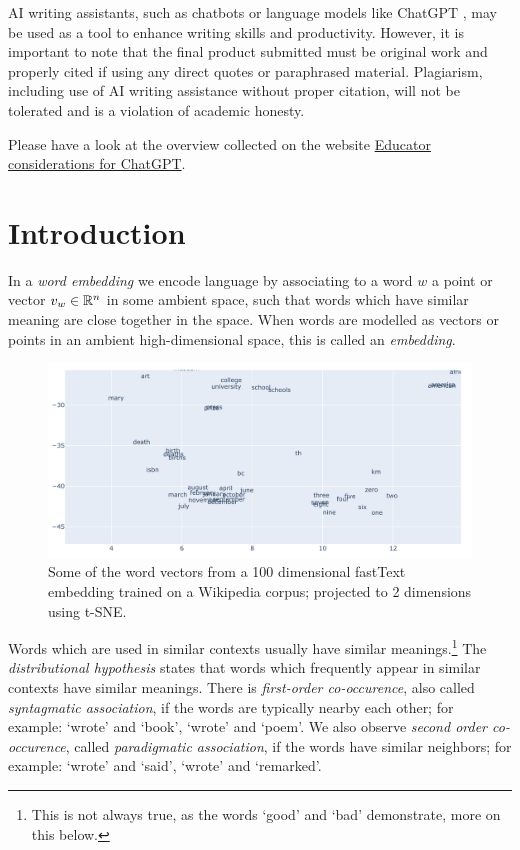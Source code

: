 \documentclass[11pt, a4paper]{amsart}
\begin{document}
AI writing assistants, such as chatbots or language models like ChatGPT \cite{ChatGPT}, may be used as a tool to enhance writing skills and productivity.
However, it is important to note that the final product submitted must be original work and properly cited if using any direct quotes or paraphrased material.
Plagiarism, including use of AI writing assistance without proper citation, will not be tolerated and is a violation of academic honesty.

Please have a look at the overview collected on the website \href{https://platform.openai.com/docs/chatgpt-education}{Educator considerations for ChatGPT}.

\clearpage
\section{Introduction}
\label{sec:intro}

In a \emph{word embedding} we encode language by associating to a word $w$ a point or vector $v_{w} \in \mathbb{R}^{n}$ in some ambient space, such that words which have similar meaning are close together in the space.
When words are modelled as vectors or points in an ambient high-dimensional space, this is called an \emph{embedding}.

\begin{figure}[H]
    \centering
    \includegraphics[width=\linewidth]{pictures/fastText_tSNE_screenshot.png}
    \caption{Some of the word vectors from a 100 dimensional fastText embedding trained on a Wikipedia corpus; projected to 2 dimensions using t-SNE.}
    \label{fig:fastText_tSNE}
\end{figure}

Words which are used in similar contexts usually have similar meanings.\footnote{This is not always true, as the words `good' and `bad' demonstrate, more on this below.}
The \emph{distributional hypothesis} states that words which frequently appear in similar contexts have similar meanings.
There is \emph{first-order co-occurence}, also called \emph{syntagmatic association}, if the words are typically nearby each other; for example: `wrote' and `book', `wrote' and `poem'.
We also observe \emph{second order co-occurence}, called \emph{paradigmatic association}, if the words have similar neighbors; for example: `wrote' and `said', `wrote' and `remarked'.
\end{document}
